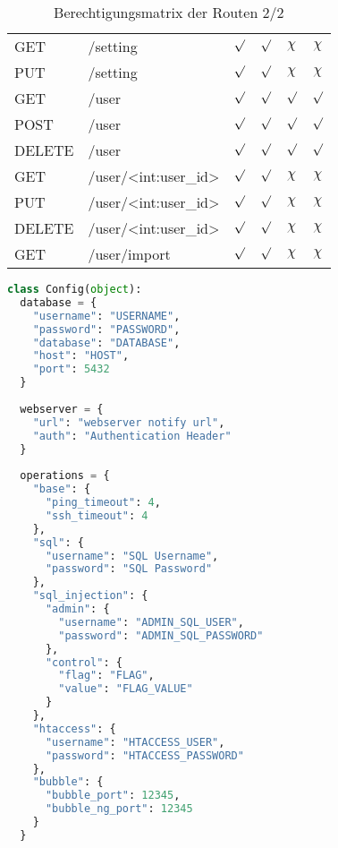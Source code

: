 \begin{table}
\begin{tabular}{l l c c c c}
		GET		& /setting							& $\surd$ & $\surd$ & $\chi$ & $\chi$ \\
		PUT		& /setting							& $\surd$ & $\surd$ & $\chi$ & $\chi$ \\
		GET		& /user								& $\surd$ & $\surd$ & $\surd$ & $\surd$ \\
		POST	& /user								& $\surd$ & $\surd$ & $\surd$ & $\surd$ \\
		DELETE	& /user								& $\surd$ & $\surd$ & $\surd$ & $\surd$ \\
		GET 	& /user/<int:user\_id>				& $\surd$ & $\surd$ & $\chi$ & $\chi$ \\
		PUT 	& /user/<int:user\_id>				& $\surd$ & $\surd$ & $\chi$ & $\chi$ \\
		DELETE	& /user/<int:user\_id>				& $\surd$ & $\surd$ & $\chi$ & $\chi$ \\
		GET		& /user/import						& $\surd$ & $\surd$ & $\chi$ & $\chi$ \\
	\end{tabular}
	\caption{Berechtigungsmatrix der Routen 2/2}
	\label{table:gis-permission}
\end{table}


\begin{lstlisting}[frame=single, language=python, caption={Config Vorlage Big Brother}, captionpos=b, label={lst:anhang-bigbrother-config-example}]
class Config(object):
  database = {
    "username": "USERNAME",
    "password": "PASSWORD",
    "database": "DATABASE",
    "host": "HOST",
    "port": 5432
  }
  
  webserver = {
    "url": "webserver notify url",
    "auth": "Authentication Header"
  }
  
  operations = {
    "base": {
      "ping_timeout": 4,
      "ssh_timeout": 4
    },
    "sql": {
      "username": "SQL Username",
      "password": "SQL Password"
    },
    "sql_injection": {
      "admin": {
        "username": "ADMIN_SQL_USER",
        "password": "ADMIN_SQL_PASSWORD"
	  },
	  "control": {
	    "flag": "FLAG",
	    "value": "FLAG_VALUE"
	  }
    },
    "htaccess": {
      "username": "HTACCESS_USER",
      "password": "HTACCESS_PASSWORD"
    },
    "bubble": {
      "bubble_port": 12345,
      "bubble_ng_port": 12345
    }
  }
\end{lstlisting}

